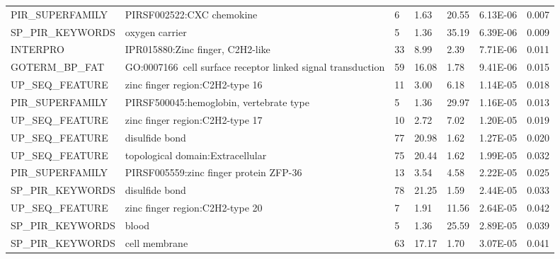 \documentclass[a4paper,10pt,oneside]{book}
\begin{document}
{\begin{longtable}{lllllll}
PIR\_SUPERFAMILY  & PIRSF002522:CXC chemokine                                       & 6     & 1.63  & 20.55           & 6.13E-06 & 0.007    \\
SP\_PIR\_KEYWORDS & oxygen carrier                                                  & 5     & 1.36  & 35.19           & 6.39E-06 & 0.009    \\
INTERPRO          & IPR015880:Zinc finger, C2H2-like                                & 33    & 8.99  & 2.39            & 7.71E-06 & 0.011    \\
GOTERM\_BP\_FAT   & GO:0007166~cell surface receptor linked signal transduction     & 59    & 16.08 & 1.78            & 9.41E-06 & 0.015    \\
UP\_SEQ\_FEATURE  & zinc finger region:C2H2-type 16                                 & 11    & 3.00  & 6.18            & 1.14E-05 & 0.018    \\
PIR\_SUPERFAMILY  & PIRSF500045:hemoglobin, vertebrate type                         & 5     & 1.36  & 29.97           & 1.16E-05 & 0.013    \\
UP\_SEQ\_FEATURE  & zinc finger region:C2H2-type 17                                 & 10    & 2.72  & 7.02            & 1.20E-05 & 0.019    \\
UP\_SEQ\_FEATURE  & disulfide bond                                                  & 77    & 20.98 & 1.62            & 1.27E-05 & 0.020    \\
UP\_SEQ\_FEATURE  & topological domain:Extracellular                                & 75    & 20.44 & 1.62            & 1.99E-05 & 0.032    \\
PIR\_SUPERFAMILY  & PIRSF005559:zinc finger protein ZFP-36                          & 13    & 3.54  & 4.58            & 2.22E-05 & 0.025    \\
SP\_PIR\_KEYWORDS & disulfide bond                                                  & 78    & 21.25 & 1.59            & 2.44E-05 & 0.033    \\
UP\_SEQ\_FEATURE  & zinc finger region:C2H2-type 20                                 & 7     & 1.91  & 11.56           & 2.64E-05 & 0.042    \\
SP\_PIR\_KEYWORDS & blood                                                           & 5     & 1.36  & 25.59           & 2.89E-05 & 0.039    \\
SP\_PIR\_KEYWORDS & cell membrane                                                   & 63    & 17.17 & 1.70            & 3.07E-05 & 0.041   

\end{longtable}
}

\restoregeometry




\ifstandalone
\begin{small}

\end{small}
\fi
\end{document}

